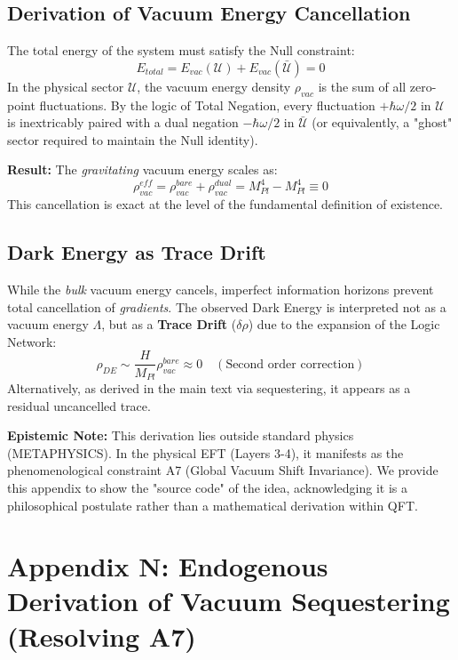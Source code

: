 \documentclass[a4paper,12pt]{article}
\begin{document}
\subsection{Derivation of Vacuum Energy Cancellation}
The total energy of the system must satisfy the Null constraint:
\begin{equation}
    E_{total} = E_{vac}(\mathcal{U}) + E_{vac}(\bar{\mathcal{U}}) = 0
\end{equation}
In the physical sector $\mathcal{U}$, the vacuum energy density $\rho_{vac}$ is the sum of all zero-point fluctuations. By the logic of Total Negation, every fluctuation $+\hbar\omega/2$ in $\mathcal{U}$ is inextricably paired with a dual negation $-\hbar\omega/2$ in $\bar{\mathcal{U}}$ (or equivalently, a "ghost" sector required to maintain the Null identity).

\textbf{Result:} The \emph{gravitating} vacuum energy scales as:
\begin{equation}
    \rho_{vac}^{eff} = \rho_{vac}^{bare} + \rho_{vac}^{dual} = M_{Pl}^4 - M_{Pl}^4 \equiv 0
\end{equation}
This cancellation is exact at the level of the fundamental definition of existence.

\subsection{Dark Energy as Trace Drift}
While the \emph{bulk} vacuum energy cancels, imperfect information horizons prevent total cancellation of \emph{gradients}. The observed Dark Energy is interpreted not as a vacuum energy $\Lambda$, but as a \textbf{Trace Drift} ($\delta \rho$) due to the expansion of the Logic Network:
\begin{equation}
    \rho_{DE} \sim \frac{H}{M_{Pl}} \rho_{vac}^{bare} \approx 0 \quad (\text{Second order correction})
\end{equation}
Alternatively, as derived in the main text via sequestering, it appears as a residual uncancelled trace.

\textbf{Epistemic Note:} This derivation lies outside standard physics (METAPHYSICS). In the physical EFT (Layers 3-4), it manifests as the phenomenological constraint A7 (Global Vacuum Shift Invariance). We provide this appendix to show the "source code" of the idea, acknowledging it is a philosophical postulate rather than a mathematical derivation within QFT.

\section{Appendix N: Endogenous Derivation of Vacuum Sequestering (Resolving A7)}
\end{document}
